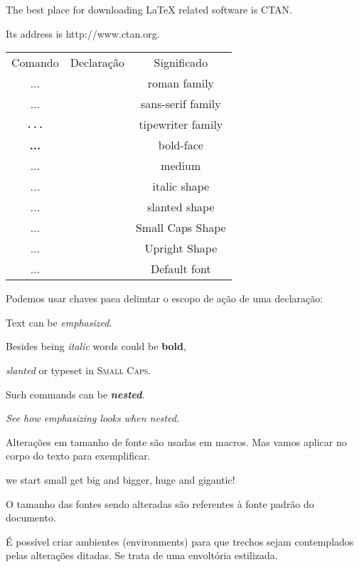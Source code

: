 \documentclass[a4paper, 12pt]{article}
\begin{document}
The best place for downloading LaTeX related software is CTAN.

Its address is \ttfamily http://www.ctan.org\rmfamily.


\begin{tabular}{ c c c }
    Comando         & Declaração  & Significado       \\
    \textrm{...}    & \rmfamily   & roman family      \\
    \textsf{...}    & \sffamily   & sans-serif family \\
    \texttt{...}    & \ttfamily   & tipewriter family \\
    \textbf{...}    & \bfseries   & bold-face         \\
    \textmd{...}    & \mdseries   & medium            \\
    \textit{...}    & \itshape    & italic shape      \\
    \textsl{...}    & \slshape    & slanted shape     \\
    \textsc{...}    & \scshape    & Small Caps Shape  \\
    \textup{...}    & \upshape    & Upright Shape     \\
    \textnormal{...}& \normalfont & Default font      \\
\end{tabular}

Podemos usar chaves paea delimtar o escopo de ação
de uma declaração:

{\sffamily

Text can be {\em emphasized}.

Besides being {\itshape italic} words could be {\bfseries bold},

{\slshape slanted} or typeset in {\scshape Small Caps}.

Such commands can be {\itshape\bfseries nested}.}

{\em See how {\em emphasizing} looks when nested.}

Alterações em tamanho de fonte são usadas em macros.
Mas vamos aplicar no corpo do texto para exemplificar.

\noindent \tiny we \scriptsize start 
\footnotesize \small small
\normalsize get
\large big 
\Large and
\LARGE bigger,
\huge huge and
\Huge gigantic!


\normalsize
O tamanho das fontes sendo alteradas são referentes à fonte padrão do documento.

É possível criar ambientes (environments) para que trechos 
sejam contemplados pelas alterações ditadas.
Se trata de uma envoltória estilizada.
\end{document}
